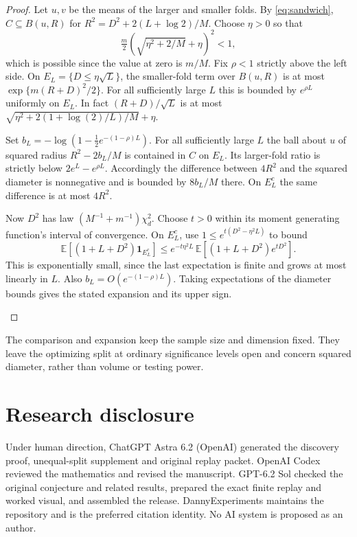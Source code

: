 \documentclass[11pt,a4paper]{amsart}
\begin{document}
\begin{proof}
Let \(u,v\) be the means of the larger and smaller folds. By \eqref{eq:sandwich}, \(C\subseteq B(u,R)\) for \(R^2=D^2+2(L+\log 2)/M\). Choose \(\eta>0\) so that
\[
 \tfrac m2\left(\sqrt{\eta^2+2/M}+\eta\right)^2<1,
\]
which is possible since the value at zero is \(m/M\). Fix \(\rho<1\) strictly above the left side. On \(E_L=\{D\le\eta\sqrt L\}\), the smaller-fold term over \(B(u,R)\) is at most \(\exp\{m(R+D)^2/2\}\). For all sufficiently large \(L\) this is bounded by \(e^{\rho L}\) uniformly on \(E_L\). In fact \((R+D)/\sqrt L\) is at most \(\sqrt{\eta^2+2(1+\log(2)/L)/M}+\eta\).

Set \(b_L=-\log(1-\tfrac12e^{-(1-\rho)L})\). For all sufficiently large \(L\) the ball about \(u\) of squared radius \(R^2-2b_L/M\) is contained in \(C\) on \(E_L\). Its larger-fold ratio is strictly below \(2e^L-e^{\rho L}\). Accordingly the difference between \(4R^2\) and the squared diameter is nonnegative and is bounded by \(8b_L/M\) there. On \(E_L^c\) the same difference is at most \(4R^2\).

\begin{samepage}
Now \(D^2\) has law \((M^{-1}+m^{-1})\chi_d^2\). Choose \(t>0\) within its moment generating function's interval of convergence. On \(E_L^c\), use \(1\le e^{t(D^2-\eta^2L)}\) to bound
\[
 \mathbb E[(1+L+D^2)\mathbf 1_{E_L^c}]
 \le e^{-t\eta^2 L}\,\mathbb E[(1+L+D^2)e^{tD^2}].
\]
This is exponentially small, since the last expectation is finite and grows at most linearly in \(L\). Also \(b_L=O(e^{-(1-\rho)L})\). Taking expectations of the diameter bounds gives the stated expansion and its upper sign.
\end{samepage}
\end{proof}

The comparison and expansion keep the sample size and dimension fixed. They leave the optimizing split at ordinary significance levels open and concern squared diameter, rather than volume or testing power.

\section*{Research disclosure}

\begingroup\raggedright
Under human direction, ChatGPT Astra 6.2 (OpenAI) generated the discovery proof, unequal-split supplement and original replay packet. OpenAI Codex reviewed the mathematics and revised the manuscript. GPT-6.2 Sol checked the original conjecture and related results, prepared the exact finite replay and worked visual, and assembled the release. DannyExperiments maintains the repository and is the preferred citation identity. No AI system is proposed as an author.
\par\endgroup
\end{document}
